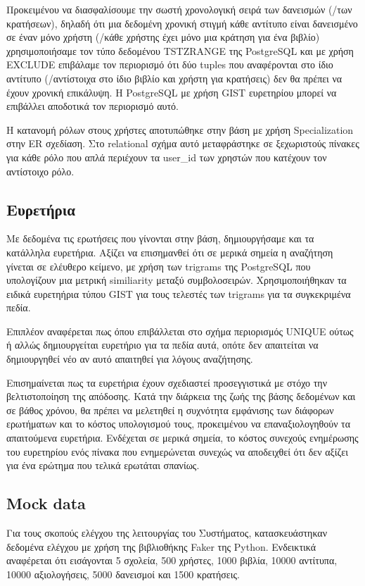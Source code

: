 \documentclass[a4paper]{article}
\begin{document}
\par Προκειμένου να διασφαλίσουμε την σωστή χρονολογική σειρά των δανεισμών (/των κρατήσεων), δηλαδή ότι μια δεδομένη χρονική στιγμή κάθε αντίτυπο είναι δανεισμένο σε έναν μόνο χρήστη (/κάθε χρήστης έχει μόνο μια κράτηση για ένα βιβλίο) χρησιμοποιήσαμε τον τύπο δεδομένου TSTZRANGE της PostgreSQL και με χρήση EXCLUDE επιβάλαμε τον περιορισμό ότι δύο tuples που αναφέρονται στο ίδιο αντίτυπο (/αντίστοιχα στο ίδιο βιβλίο και χρήστη για κρατήσεις) δεν θα πρέπει να έχουν χρονική επικάλυψη. Η PostgreSQL με χρήση GIST ευρετηρίου μπορεί να επιβάλλει αποδοτικά τον περιορισμό αυτό.

\par Η κατανομή ρόλων στους χρήστες αποτυπώθηκε στην βάση με χρήση Specialization στην ER σχεδίαση. Στο relational σχήμα αυτό μεταφράστηκε σε ξεχωριστούς πίνακες για κάθε ρόλο που απλά περιέχουν τα user\_id των χρηστών που κατέχουν τον αντίστοιχο ρόλο.

\subsection{Ευρετήρια}

\par Με δεδομένα τις ερωτήσεις που γίνονται στην βάση, δημιουργήσαμε και τα κατάλληλα ευρετήρια. Αξίζει να επισημανθεί ότι σε μερικά σημεία η αναζήτηση γίνεται σε ελέυθερο κείμενο, με χρήση των trigrams της PostgreSQL που υπολογίζουν μια μετρική similiarity μεταξύ συμβολοσειρών. Χρησιμοποιήθηκαν τα ειδικά ευρετηήρια τύπου GIST για τους τελεστές των trigrams για τα συγκεκριμένα πεδία.

\par Επιπλέον αναφέρεται πως όπου επιβάλλεται στο σχήμα περιορισμός UNIQUE ούτως ή αλλώς δημιουργείται ευρετήριο για τα πεδία αυτά, οπότε δεν απαιτείται να δημιουργηθεί νέο αν αυτό απαιτηθεί για λόγους αναζήτησης.

\par Επισημαίνεται πως τα ευρετήρια έχουν σχεδιαστεί προσεγγιστικά με στόχο την βελτιστοποίηση της απόδοσης. Κατά την διάρκεια της ζωής της βάσης δεδομένων και σε βάθος χρόνου, θα πρέπει να μελετηθεί η συχνότητα εμφάνισης των διάφορων ερωτήματων και το κόστος υπολογισμού τους, προκειμένου να επαναξιολογηθούν τα απαιτούμενα ευρετήρια. Ενδέχεται σε μερικά σημεία, το κόστος συνεχούς ενημέρωσης του ευρετηρίου ενός πίνακα που ενημερώνεται συνεχώς να αποδειχθεί ότι δεν αξίζει για ένα ερώτημα που τελικά ερωτάται σπανίως.

\subsection{Mock data}
\label{mock_data}
\par Για τους σκοπούς ελέγχου της λειτουργίας του Συστήματος, κατασκευάστηκαν δεδομένα ελέγχου με χρήση της βιβλιοθήκης Faker της Python. Ενδεικτικά αναφέρεται ότι εισάγονται 5 σχολεία, 500 χρήστες, 1000 βιβλία, 10000 αντίτυπα, 10000 αξιολογήσεις, 5000 δανεισμοί και 1500 κρατήσεις.
\end{document}
